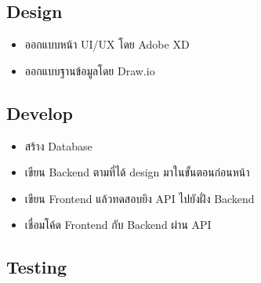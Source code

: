 \subsection{Design}
\begin{itemize}
  \item ออกแบบหน้า UI/UX โดย Adobe XD
  \item ออกแบบฐานข้อมูลโดย Draw.io
\end{itemize}

\subsection{Develop}
\begin{itemize}
  \item สร้าง Database
  \item เขียน Backend ตามที่ได้ design มาในขั้นตอนก่อนหน้า
  \item เขียน Frontend แล้วทดสอบยิง API ไปยังฝั่ง Backend
  \item เชื่อมโค้ด Frontend กับ Backend ผ่าน API
\end{itemize}

\subsection{Testing}
